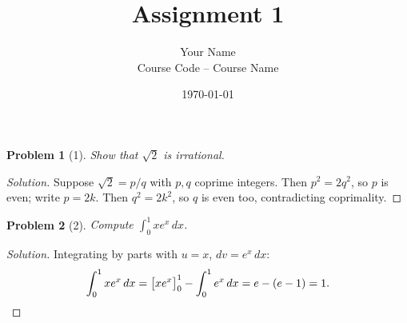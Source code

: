 \documentclass[11pt]{article}
\title{Assignment 1}
\author{Your Name \\ \small Course Code -- Course Name}
\date{\today}
\newtheorem*{problem}{Problem}
\newenvironment{solution}{\begin{proof}[Solution]}{\end{proof}}
\begin{document}
\maketitle

\begin{problem}[1]
Show that $\sqrt{2}$ is irrational.
\end{problem}
\begin{solution}
Suppose $\sqrt{2} = p/q$ with $p, q$ coprime integers. Then $p^2 = 2q^2$, so $p$ is even; write $p = 2k$.
Then $q^2 = 2k^2$, so $q$ is even too, contradicting coprimality.
\end{solution}

\begin{problem}[2]
Compute $\displaystyle\int_0^1 x e^{x}\,dx$.
\end{problem}
\begin{solution}
Integrating by parts with $u = x$, $dv = e^x\,dx$:
\[
  \int_0^1 x e^{x}\,dx = \big[x e^{x}\big]_0^1 - \int_0^1 e^{x}\,dx = e - (e - 1) = 1. \qedhere
\]
\end{solution}
\end{document}
